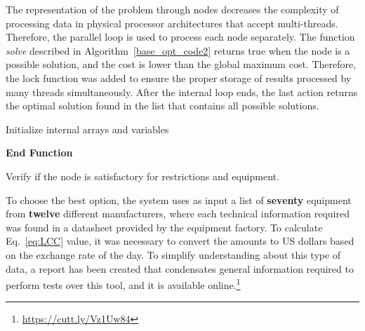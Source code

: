 \documentclass[journal]{IEEEtran}
\begin{document}
The representation of the problem through nodes decreases the complexity of processing data in physical processor architectures that accept multi-threads. Therefore, the parallel loop is used to process each node separately. The function \textit{solve} described in Algorithm~\ref{base_opt_code2} returns true when the node is a possible solution, and the cost is lower than the global maximum cost. Therefore, the lock function was added to ensure the proper storage of results processed by many threads simultaneously. After the internal loop ends, the last action returns the optimal solution found in the list that contains all possible solutions.

\begin{algorithm}[ht]
\SetAlgoLined
{}
 Initialize internal arrays and variables\;
 
\textbf{End Function}\;
\caption{Verify if the node is satisfactory for restrictions and equipment.}
\label{base_opt_code2}
\end{algorithm}

To choose the best option, the system uses as input a list of \textbf{seventy} equipment from \textbf{twelve} 
different manufacturers, where each technical information required was found in a datasheet provided by the equipment factory. To calculate Eq.~\eqref{eq:LCC} value,
it was necessary to convert the amounts to US dollars based on the exchange rate of the day. To simplify understanding about this type of data, a report has been created that condensates general information required to perform tests over this tool, and it is available online.\footnote{\label{note1}\href{https://cutt.ly/Vz1Uw84}{https://cutt.ly/Vz1Uw84}}
\end{document}
